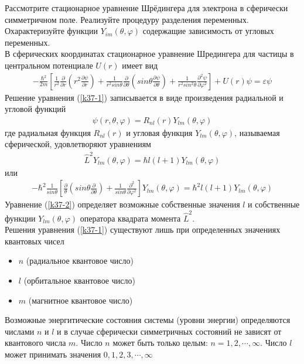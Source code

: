 \documentclass[__main__.tex]{subfiles}
\begin{document}
	
	Рассмотрите стационарное уравнение Шрёдингера для электрона в сферически симметричном поле. Реализуйте процедуру разделения переменных. Охарактеризуйте функции $Y_{im}(\theta,\varphi)$ содержащие зависимость от угловых переменных.\\ 
	
	В сферических координатах стационарное уравнение Шредингера для частицы в центральном потенциале $U(r)$ имеет вид
	\begin{gather}
		\label{k37-1}
		-\frac{\hbar^2}{2m}\left[\frac{1}{r^2}\frac{\partial}{\partial r}\left(r^2\frac{\partial \psi}{\partial r}\right)+\frac{1}{r^2sin\theta}\frac{\partial}{\partial\theta}\left(sin\theta\frac{\partial \psi}{\partial \theta}\right)+\frac{1}{r^2sin^2\theta}\frac{\partial^2\psi}{\partial \varphi^2}\right]+U(r)\psi = \varepsilon\psi
	\end{gather}
	Решение уравнения (\ref{k37-1}) записывается в виде произведения радиальной и угловой функций
	\begin{gather*}
		\psi(r,\theta,\varphi) = R_{nl}(r)Y_{lm}(\theta,\varphi)
	\end{gather*}
	где радиальная функция $R_{nl}(r)$ и угловая функция $Y_{lm}(\theta,\varphi)$, называемая сферической, удовлетворяют уравнениям
	\begin{gather}
		\label{k37-2}
		\hat{L}^2Y_{lm}(\theta,\varphi) = \hbar l(l+1)Y_{lm}(\theta,\varphi)
	\end{gather}
	или
	\begin{gather*}
		-\hbar^2\frac{1}{sin\theta}\left[\frac{\partial}{\theta}\left(sin\theta\frac{\partial}{\partial\theta}\right)+\frac{1}{sin\theta}\frac{\partial^2}{\partial\varphi^2}\right]Y_{lm}(\theta,\varphi) = \hbar^2 l(l+1)Y_{lm}(\theta,\varphi)
	\end{gather*}
	Уравнение (\ref{k37-2}) определяет возможные собственные значения $l$ и собственные функции $Y_{lm}(\theta,\varphi)$ оператора квадрата момента $\hat{L}^2$.\\
	Решения уравнения (\ref{k37-1}) существуют лишь при определенных значениях квантовых чисел
	\begin{itemize}
		\item $n$ (радиальное квантовое число)
		\item $l$ (орбитальное квантовое число)
		\item $m$ (магнитное квантовое число)
	\end{itemize} 
	Возможные энергитические состояния системы (уровни энергии) определяются числами $n$ и $l$ и в случае сферически симметричных состояний не зависят от квантового числа $m$. Число $n$ может быть только целым: $n = 1,2,\cdots, \infty$. Число $l$ может принимать значения $0,1,2,3,\cdots, \infty$
\end{document}
